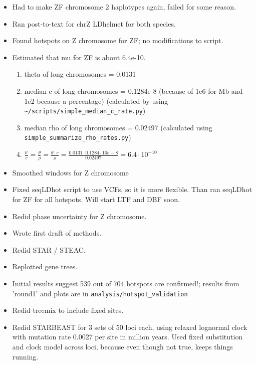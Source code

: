 \documentclass[idxtotoc,hyperref,openany,oneside]{labbook} %
\begin{document}
\begin{itemize}
\item Had to make ZF chromosome 2 haplotypes again, failed for some reason.
\item Ran post-to-text for chrZ LDhelmet for both species.
\item Found hotspots on Z chromosome for ZF; no modifications to script.
\item Estimated that mu for ZF is about 6.4e-10.
\begin{enumerate}
	\item theta of long chromosomes = 0.0131
	\item median c of long chromosomes =  0.1284e-8 (because of 1e6 for Mb and 1e2 because a percentage) (calculated by using \verb+~/scripts/simple_median_c_rate.py+)
	\item median rho of long chromosomes = 0.02497 (calculated using \verb+simple_summarize_rho_rates.py+)
	\item $ \frac{\mu}{c} = \frac{\theta}{\rho} = \frac{\theta \cdot c}{\rho}  = \frac{0.0131 \cdot 0.1284 \cdot 10e-8}{0.02497} = 6.4 \cdot 10^{-10}$
\end{enumerate}
\item Smoothed windows for Z chromosome
\item Fixed seqLDhot script to use VCFs, so it is more flexible. Than ran seqLDhot for ZF for all hotspots. Will start LTF and DBF soon.
\item Redid phase uncertainty for Z chromosome.
\item Wrote first draft of methods.
\item Redid STAR / STEAC.
\item Replotted gene trees.
\item Initial results suggest 539 out of 704 hotspots are confirmed!; results from 'round1' and plots are in \verb+analysis/hotspot_validation+
\item Redid treemix to include fixed sites.
\item Redid STARBEAST for 3 sets of 50 loci each, using relaxed lognormal clock with mutation rate 0.0027 per site in million years. Used fixed substitution and clock model across loci, because even though not true, keeps things running.
\end{itemize}
\end{document}
